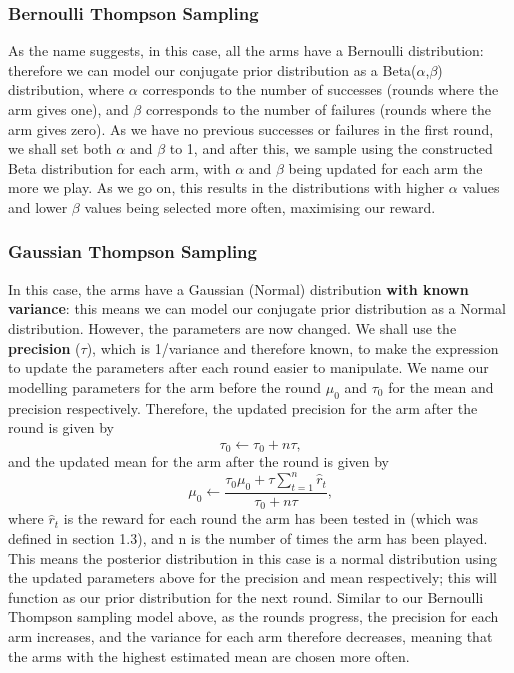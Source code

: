     \subsubsection{Bernoulli Thompson Sampling}
    As the name suggests, in this case, all the arms have a Bernoulli distribution: therefore we can model our conjugate prior distribution as a Beta($\alpha$,$\beta$) distribution, where $\alpha$ corresponds to the number of successes (rounds where the arm gives one), and $\beta$ corresponds to the number of failures (rounds where the arm gives zero). As we have no previous successes or failures in the first round, we shall set both $\alpha$ and $\beta$ to 1, and after this, we sample using the constructed Beta distribution for each arm, with $\alpha$ and $\beta$ being updated for each arm the more we play. As we go on, this results in the distributions with higher $\alpha$ values and lower $\beta$ values being selected more often, maximising our reward.

    \subsubsection{Gaussian Thompson Sampling}
    In this case, the arms have a Gaussian (Normal) distribution \textbf{with known variance}: this means we can model our conjugate prior distribution as a Normal distribution.
    However, the parameters are now changed.
    We shall use the \textbf{precision} ($\tau$), which is 1/variance and therefore known, to make the expression to update the parameters after each round easier to manipulate.
    We name our modelling parameters for the arm before the round $\mu_0$ and $\tau_0$ for the mean and precision respectively.
    Therefore, the updated precision for the arm after the round is given by
    \[\tau_0\xleftarrow{}\tau_0 + n\tau\text{,}\]
    and the updated mean for the arm after the round is given by
    \[\mu_0\xleftarrow{}\frac{\tau_0\mu_0 + \tau\sum_{t=1}^n\widehat{r}_t}{\tau_0 + n\tau}\text{,}\]
    where $\widehat{r}_t$ is the reward for each round the arm has been tested in \citep{agrawal2013further} (which was defined in section 1.3), and n is the number of times the arm has been played. This means the posterior distribution in this case is a normal distribution using the updated parameters above for the precision and mean respectively;
    this will function as our prior distribution for the next round.
    Similar to our Bernoulli Thompson sampling model above, as the rounds progress, the precision for each arm increases, and the variance for each arm therefore decreases, meaning that the arms with the highest estimated mean are chosen more often.

